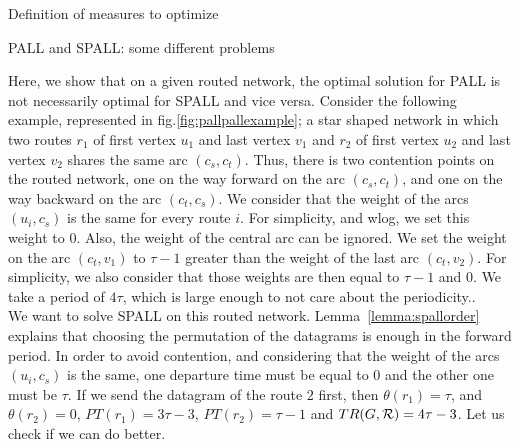 \documentclass[10pt]{article}
\newcommand\pall{\textsc{PALL}\xspace}
\newcommand\spall{\textsc{SPALL}\xspace}
\begin{document}
\begin{subsection}{Definition of measures to optimize}
        
        \end{subsection}
     \begin{subsection}{\pall and \spall: some different problems}
     
     
Here, we show that on a given routed network, the optimal solution for \pall is not necessarily optimal for \spall and vice versa.
  Consider the following example, represented in fig.\ref{fig:pallpallexample}; a star shaped network in which two routes $r_1$ of first vertex $u_1$ and last vertex $v_1$ and $r_2$ of first vertex $u_2$ and last vertex $v_2$ shares the same arc $(c_s,c_t)$. Thus, there is two contention points on the routed network, one on the way forward on the arc $(c_s,c_t )$, and one on the way backward on the arc $(c_t,c_s)$.
  We consider that the weight of the arcs $(u_i,c_s)$ is the same for every route $i$. For simplicity, and wlog, we set this weight to $0$. Also, the weight of the central arc can be ignored.
  We set the weight on the arc $(c_t,v_1)$ to $\tau -1$ greater than the weight of the last arc $(c_t,v_2)$. For simplicity, we also consider that those weights are then equal to $\tau-1$ and $0$.
  We take a period of $4\tau$, which is large enough to not care about the periodicity..\\
  
We want to solve \spall on this routed network. Lemma~\ref{lemma:spallorder} explains that choosing the permutation of the datagrams is enough in the forward period. In order to avoid contention, and considering that the weight of the arcs $(u_i,c_s)$ is the same, one departure time must be equal to $0$ and the other one must be $\tau$. If we send the datagram of the route $2$ first, then  $\theta(r_1) = \tau$, and $\theta (r_2) = 0 $, $PT(r_1) = 3\tau-3$, $PT(r_2) = \tau -1$ and $TR(G,{\cal R}) =4\tau-3$. Let us check if we can do better.\newline


\end{subsection}
\end{document}
